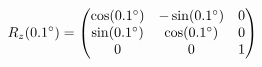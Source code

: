 \documentclass[preview]{standalone}
\begin{document}
\begin{align*}
\special{dvisvgm:raw <g id='unique000'>}R_z(0.1^\circ) = \begin{pmatrix} \cos(0.1^\circ) & -\sin(0.1^\circ) & 0 \\ \sin(0.1^\circ) & \cos(0.1^\circ) & 0 \\ 0 & 0 & 1 \end{pmatrix}\special{dvisvgm:raw </g>}
\end{align*}
\end{document}
